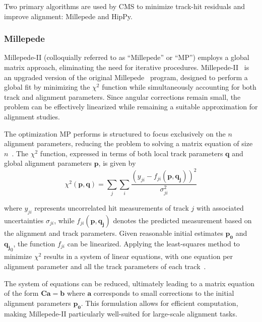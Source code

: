 Two primary algorithms are used by CMS to minimize track-hit residuals and improve alignment: Millepede and HipPy. 

\subsubsection{Millepede}

Millepede-II (colloquially referred to as ``Millepede'' or ``MP'') employs a global matrix approach, eliminating the need for iterative procedures. Millepede-II~\cite{BLOBEL20065} is an upgraded version of the original Millepede~\cite{blobel2002newmethodhighprecisionalignment} program, designed to perform a global fit by minimizing the $\chi^2$ function while simultaneously accounting for both track and alignment parameters. Since angular corrections remain small, the problem can be effectively linearized while remaining a suitable approximation for alignment studies.

The optimization MP performs is structured to focus exclusively on the $n$ alignment parameters, reducing the problem to solving a matrix equation of size $n$~\cite{WAdam_2009}. The $\chi^2$ function, expressed in terms of both local track parameters $\mathbf{q}$ and global alignment parameters $\mathbf{p}$, is given by  
\begin{equation}
\chi^2(\mathbf{p},\mathbf{q}) = \sum_{j} \sum_{i} \frac{\left(y_{ji} - f_{ji}(\mathbf{p}, \mathbf{q_j})\right)^2}{\sigma^2_{ji}}
\end{equation}

where $y_{ji}$ represents uncorrelated hit measurements of track $j$ with associated uncertainties $\sigma_{ji}$, while $f_{ji}(\mathbf{p}, \mathbf{q_j})$ denotes the predicted measurement based on the alignment and track parameters. Given reasonable initial estimates $\mathbf{p_0}$ and $\mathbf{q_j}_0$, the function $f_{ji}$ can be linearized. Applying the least-squares method to minimize $\chi^2$ results in a system of linear equations, with one equation per alignment parameter and all the track parameters of each track~\cite{WAdam_2009}.

The system of equations can be reduced, ultimately leading to a matrix equation of the form $\mathbf{C} \mathbf{a} = \mathbf{b}$ where $\mathbf{a}$ corresponds to small corrections to the initial alignment parameters $\mathbf{p_0}$. This formulation allows for efficient computation, making Millepede-II particularly well-suited for large-scale alignment tasks.




